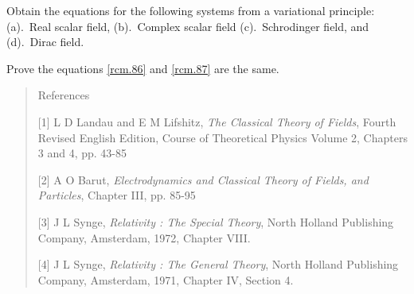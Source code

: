 \exise Obtain the equations for the following systems from 
a 
variational principle: (a).\ Real scalar  field, (b).\ 
Complex scalar field (c).\ Schrodinger field, and (d).\  
Dirac field.

\exise Prove the equations \eqref{rcm.86} and
\eqref{rcm.87} are the same.

\begin{small}
\begin{quote}
{References}

[1] L D Landau and E M Lifshitz, \textsl{The Classical 
Theory of Fields}, Fourth Revised English Edition, Course of 
Theoretical Physics Volume 2, Chapters 3 and 4, pp. 43-85

[2] A O Barut, \textsl{Electrodynamics and Classical  
Theory of Fields, and Particles},  Chapter III,  pp. 
85-95

[3] J L Synge, \textsl{Relativity :  The Special 
Theory},  North Holland Publishing Company, Amsterdam, 
1972,  Chapter VIII. 

[4] J L Synge, \textsl{Relativity :  The General 
Theory},   North Holland Publishing Company, Amsterdam, 
1971,  Chapter IV, Section 4.
\end{quote}
\end{small}
